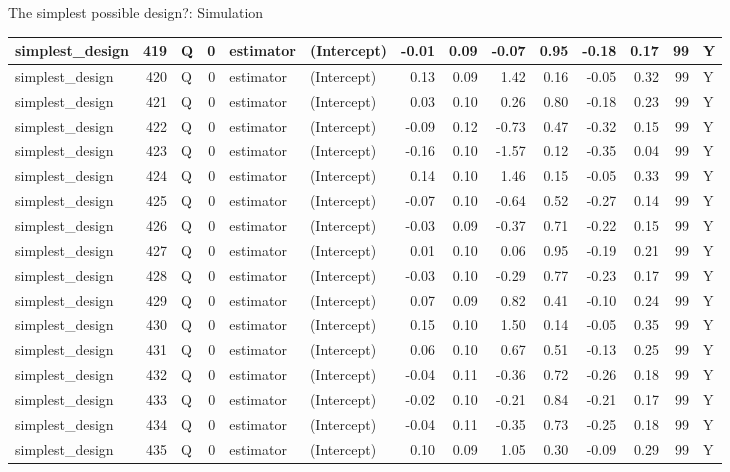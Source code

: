 \documentclass[
  11pt,
  ignorenonframetext,
]{beamer}
\begin{document}
\begin{frame}[fragile]{The simplest possible design?: Simulation}
\begin{tabular}{l|r|l|r|l|l|r|r|r|r|r|r|r|l}
\hline
simplest\_design & 419 & Q & 0 & estimator & (Intercept) & -0.01 & 0.09 & -0.07 & 0.95 & -0.18 & 0.17 & 99 & Y\\
\hline
simplest\_design & 420 & Q & 0 & estimator & (Intercept) & 0.13 & 0.09 & 1.42 & 0.16 & -0.05 & 0.32 & 99 & Y\\
\hline
simplest\_design & 421 & Q & 0 & estimator & (Intercept) & 0.03 & 0.10 & 0.26 & 0.80 & -0.18 & 0.23 & 99 & Y\\
\hline
simplest\_design & 422 & Q & 0 & estimator & (Intercept) & -0.09 & 0.12 & -0.73 & 0.47 & -0.32 & 0.15 & 99 & Y\\
\hline
simplest\_design & 423 & Q & 0 & estimator & (Intercept) & -0.16 & 0.10 & -1.57 & 0.12 & -0.35 & 0.04 & 99 & Y\\
\hline
simplest\_design & 424 & Q & 0 & estimator & (Intercept) & 0.14 & 0.10 & 1.46 & 0.15 & -0.05 & 0.33 & 99 & Y\\
\hline
simplest\_design & 425 & Q & 0 & estimator & (Intercept) & -0.07 & 0.10 & -0.64 & 0.52 & -0.27 & 0.14 & 99 & Y\\
\hline
simplest\_design & 426 & Q & 0 & estimator & (Intercept) & -0.03 & 0.09 & -0.37 & 0.71 & -0.22 & 0.15 & 99 & Y\\
\hline
simplest\_design & 427 & Q & 0 & estimator & (Intercept) & 0.01 & 0.10 & 0.06 & 0.95 & -0.19 & 0.21 & 99 & Y\\
\hline
simplest\_design & 428 & Q & 0 & estimator & (Intercept) & -0.03 & 0.10 & -0.29 & 0.77 & -0.23 & 0.17 & 99 & Y\\
\hline
simplest\_design & 429 & Q & 0 & estimator & (Intercept) & 0.07 & 0.09 & 0.82 & 0.41 & -0.10 & 0.24 & 99 & Y\\
\hline
simplest\_design & 430 & Q & 0 & estimator & (Intercept) & 0.15 & 0.10 & 1.50 & 0.14 & -0.05 & 0.35 & 99 & Y\\
\hline
simplest\_design & 431 & Q & 0 & estimator & (Intercept) & 0.06 & 0.10 & 0.67 & 0.51 & -0.13 & 0.25 & 99 & Y\\
\hline
simplest\_design & 432 & Q & 0 & estimator & (Intercept) & -0.04 & 0.11 & -0.36 & 0.72 & -0.26 & 0.18 & 99 & Y\\
\hline
simplest\_design & 433 & Q & 0 & estimator & (Intercept) & -0.02 & 0.10 & -0.21 & 0.84 & -0.21 & 0.17 & 99 & Y\\
\hline
simplest\_design & 434 & Q & 0 & estimator & (Intercept) & -0.04 & 0.11 & -0.35 & 0.73 & -0.25 & 0.18 & 99 & Y\\
\hline
simplest\_design & 435 & Q & 0 & estimator & (Intercept) & 0.10 & 0.09 & 1.05 & 0.30 & -0.09 & 0.29 & 99 & Y\\

\end{tabular}
\end{frame}
\end{document}

